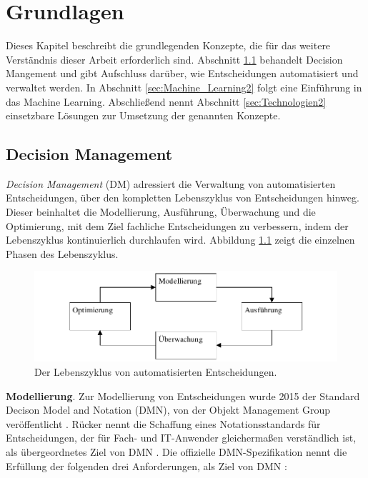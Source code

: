 \chapter{Grundlagen}
\label{ch:Grundlagen2}

Dieses Kapitel beschreibt die grundlegenden Konzepte, die für das weitere Verständnis dieser Arbeit erforderlich sind. Abschnitt \ref{sec:Decision_Management2} behandelt Decision Mangement und gibt Aufschluss darüber, wie Entscheidungen automatisiert und verwaltet werden. In Abschnitt  \ref{sec:Machine_Learning2} folgt eine Einführung in das Machine Learning. Abschließend nennt Abschnitt \ref{sec:Technologien2} einsetzbare Lösungen zur Umsetzung der genannten Konzepte. 

\section{Decision Management}
\label{sec:Decision_Management2}

\emph{Decision Management} (DM) adressiert die Verwaltung von automatisierten Entscheidungen, über den kompletten Lebenszyklus von Entscheidungen hinweg. Dieser beinhaltet die Modellierung, Ausführung, Überwachung und die Optimierung, mit dem Ziel fachliche Entscheidungen zu verbessern, indem der Lebenszyklus kontinuierlich durchlaufen wird. Abbildung \ref{fig:lifecycle} zeigt die einzelnen Phasen des Lebenszyklus.

\begin{figure}[ht]
\centering
\includegraphics{images/lifecycle.pdf}
\caption{Der Lebenszyklus von automatisierten Entscheidungen.}
\label{fig:lifecycle}
\end{figure}

\textbf{Modellierung}. Zur Modellierung von Entscheidungen wurde 2015 der Standard Decison Model and Notation (DMN), von der Objekt Management Group veröffentlicht \cite[vgl. S. 7 ff.]{OM16}. Rücker nennt die Schaffung eines Notationsstandards für Entscheidungen, der für Fach- und IT-Anwender gleichermaßen verständlich ist, als übergeordnetes Ziel von DMN \cite[vgl. S. 40]{BR16}.  Die offizielle DMN-Spezifikation nennt die Erfüllung der folgenden drei Anforderungen, als Ziel von DMN \cite[vgl. S. 18 ff.]{OM16}: 

